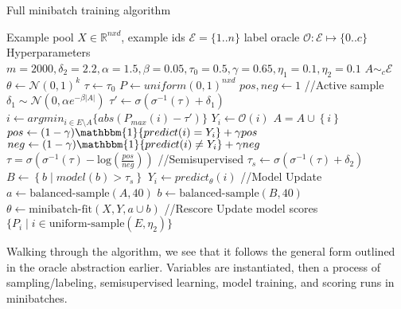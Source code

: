 \documentclass{article}
\begin{document}
\begin{algorithm}
\caption{Full minibatch training algorithm}
\label{alg:the_alg}
\begin{algorithmic}[1]
\Require Example pool $X\in\mathbb{R}^{nxd}$, example ids $\mathcal{E}=\{1..n\}$
\Require label oracle $\mathcal{O}:\mathcal{E}\mapsto\{0..c\}$
\State Hyperparameters $m=2000, \delta_2=2.2, \alpha=1.5, \beta=0.05, \tau_0=0.5, \gamma=0.65, \eta_1=0.1,\eta_2=0.1$ 
\State $A \sim_{c} \mathcal{E} $ 
\State $\theta \leftarrow \mathcal{N}(0,1)^{k}$ 
\State $\tau \leftarrow \tau_0 $ 
\State $P \leftarrow uniform(0,1)^{nxd}$ 
\State $pos,neg \leftarrow 1$ 
\State 
\State //Active
 
\State sample $\delta_1 \sim  \mathcal{N}(0,\alpha e^{-\beta | A | })$ 
\State $\tau' \leftarrow \sigma(\sigma^{-1}(\tau)+\delta_1)$ 
\State $i \leftarrow argmin_{i \in E \setminus A} \{ abs(P_{max}(i) - \tau')\}$ 
\State $Y_i \leftarrow \mathcal{O}(i)$ 
\State $A = A \cup \left\{ i \right\}$ 
\State $pos \leftarrow (1-\gamma)\mathbbm{1}\{predict(i)=Y_i\} + \gamma pos$
\State $neg \leftarrow (1-\gamma)\mathbbm{1}\{predict(i) \neq Y_i\} + \gamma neg$
\State $\tau = \sigma(\sigma^{-1}(\tau) - \mathrm{ log}(\frac{pos}{neg}))$ 
\EndIf
\State 
\State //Semisupervised
\State $\tau_s \leftarrow \sigma(\sigma^{-1}(\tau)+\delta_2)$ 
\State $B \leftarrow \left\{b \mid model(b)> \tau_s \right\}$ 
\State $Y_i \leftarrow predict_{\theta} (i)$
\EndFor
\State
\State //Model Update
\State $a \leftarrow \textrm{balanced-sample}(A,40)$
\State $b \leftarrow \textrm{balanced-sample}(B,40)$
\State $\theta \leftarrow \textrm{minibatch-fit}(X,Y,a \cup b)$
\State
\State //Rescore
\State Update model scores $\{ P_i \mid i \in \textrm{uniform-sample}(E,\eta_2) \}$
\EndFor
\end{algorithmic}
\end{algorithm}

Walking through the algorithm, we see that it follows the general form outlined in the oracle abstraction earlier.  Variables are instantiated, then a process of sampling/labeling, semisupervised learning, model training, and scoring runs in minibatches.  
\end{document}
